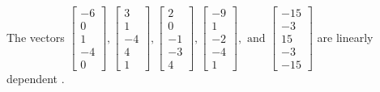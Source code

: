 \begin{exercise}
\begin{exerciseStatement}
  \end{exerciseStatement}
  \begin{exerciseAnswer}
   The vectors \(\left[\begin{array}{r}
-6 \\
0 \\
1 \\
-4 \\
0
\end{array}\right] , \left[\begin{array}{r}
3 \\
1 \\
-4 \\
4 \\
1
\end{array}\right] , \left[\begin{array}{r}
2 \\
0 \\
-1 \\
-3 \\
4
\end{array}\right] , \left[\begin{array}{r}
-9 \\
1 \\
-2 \\
-4 \\
1
\end{array}\right] , \text{ and } \left[\begin{array}{r}
-15 \\
-3 \\
15 \\
-3 \\
-15
\end{array}\right]\) are 
  	 linearly dependent  .
  


  \end{exerciseAnswer}
\end{exercise}